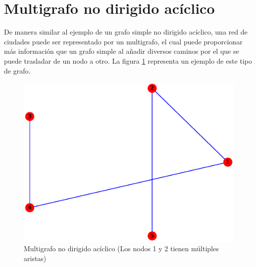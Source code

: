 \documentclass{article}
\begin{document}
\section{Multigrafo no dirigido acíclico}
De manera similar al ejemplo de un grafo simple no dirigido acíclico, una red de ciudades puede ser representado por un multigrafo, el cual puede proporcionar más información que un grafo simple al añadir diversos caminos por el que se puede trasladar de un nodo a otro. La figura \ref{fig:MNDA} representa un ejemplo de este tipo de grafo.
\begin{figure}[H]
    \includegraphics[width=\textwidth]{7-MNDA}
    \caption{Multigrafo no dirigido acíclico (Los nodos 1 y 2 tienen múltiples aristas)}
    \label{fig:MNDA}
\end{figure}



\end{document}
